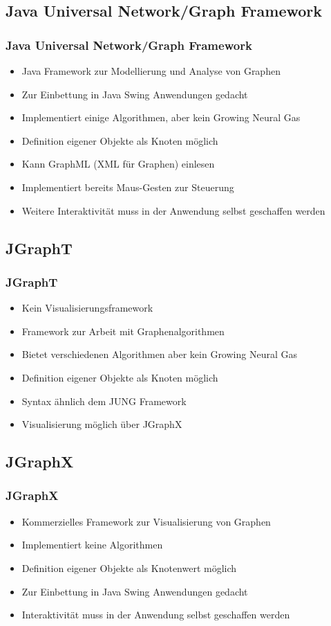 \subsection{Java Universal Network/Graph Framework}
\begin{frame}
	\frametitle{Java Universal Network/Graph Framework}
	\begin{itemize}
		\item Java Framework zur Modellierung und Analyse von Graphen
		\item Zur Einbettung in Java Swing Anwendungen gedacht
		\item Implementiert einige Algorithmen, aber kein Growing Neural Gas
		\item Definition eigener Objekte als Knoten möglich
		\item Kann GraphML (XML für Graphen) einlesen
		\item Implementiert bereits Maus-Gesten zur Steuerung
		\item Weitere Interaktivität muss in der Anwendung selbst geschaffen werden
	\end{itemize}
\end{frame}

\subsection{JGraphT}
\begin{frame}
	\frametitle{JGraphT}
	\begin{itemize}
		\item Kein Visualisierungsframework
		\item Framework zur Arbeit mit Graphenalgorithmen
		\item Bietet verschiedenen Algorithmen aber kein Growing Neural Gas
		\item Definition eigener Objekte als Knoten möglich
		\item Syntax ähnlich dem JUNG Framework
		\item Visualisierung möglich über JGraphX
	\end{itemize}
\end{frame}

\subsection{JGraphX}
\begin{frame}
	\frametitle{JGraphX}
	\begin{itemize}
		\item Kommerzielles Framework zur Visualisierung von Graphen 
		\item Implementiert keine Algorithmen
		\item Definition eigener Objekte als Knotenwert möglich
		\item Zur Einbettung in Java Swing Anwendungen gedacht
		\item Interaktivität muss in der Anwendung selbst geschaffen werden
	\end{itemize}
\end{frame}

